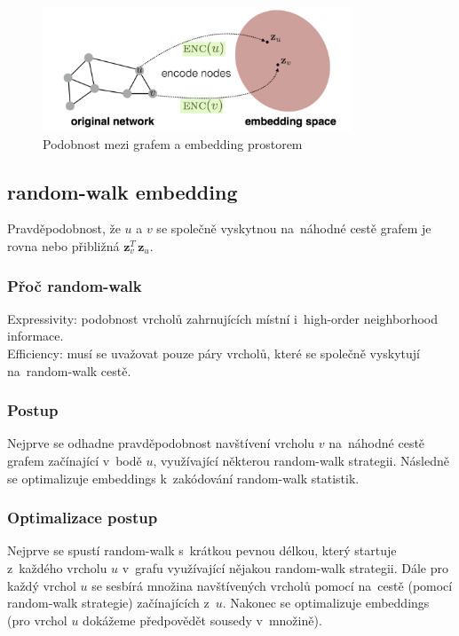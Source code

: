 \begin{figure}[ht]
    \centering
    \includegraphics[height=10em]{images/11_similarity}
    \caption{Podobnost mezi grafem a embedding prostorem}
\end{figure}

\subsection{random-walk embedding}

Pravděpodobnost, že $u$ a $v$ se společně vyskytnou na~náhodné cestě grafem je rovna nebo přibližná $\mathbf{z}_{v}^{T}\,\mathbf{z}_{u}$.

\subsubsection{Přoč random-walk}

{}Expressivity: podobnost vrcholů zahrnujících místní i~high-order neighborhood informace.
\\Efficiency: musí se uvažovat pouze páry vrcholů, které se společně vyskytují na~random-walk cestě.

\subsubsection{Postup}

Nejprve se odhadne pravděpodobnost navštívení vrcholu $v$ na~náhodné cestě grafem začínající v~bodě $u$, využívající některou random-walk strategii. 
Následně se optimalizuje embeddings k~zakódování random-walk statistik.

\subsubsection{Optimalizace postup}

Nejprve se spustí random-walk s~krátkou pevnou délkou, který startuje z~každého vrcholu $u$ v~grafu využívající nějakou random-walk strategii.
Dále pro každý vrchol $u$ se sesbírá množina navštívených vrcholů pomocí na~cestě (pomocí random-walk strategie) začínajících z~$u$.
Nakonec se optimalizuje embeddings (pro vrchol $u$ dokážeme předpovědět sousedy v~množině).

